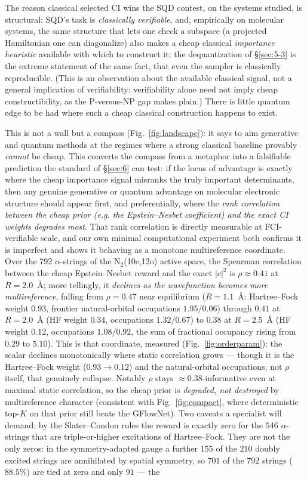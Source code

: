 \documentclass[onecolumn,a4paper]{quantumarticle}
\begin{document}
The reason classical selected CI wins the SQD contest, on the systems studied, is structural: SQD's task is \emph{classically verifiable}, and, empirically on molecular systems, the same structure that lets one check a subspace (a projected Hamiltonian one can diagonalize) also makes a cheap classical \emph{importance heuristic} available with which to construct it; the dequantization of \S\ref{sec:5-3} is the extreme statement of the same fact, that even the sampler is classically reproducible. (This is an observation about the available classical signal, not a general implication of verifiability: verifiability alone need not imply cheap constructibility, as the P-versus-NP gap makes plain.) There is little quantum edge to be had where such a cheap classical construction happens to exist.

This is not a wall but a compass (Fig.~\ref{fig:landscape}): it says to aim generative and quantum methods at the regimes where a strong classical baseline provably \emph{cannot} be cheap. This converts the compass from a metaphor into a falsifiable prediction the standard of \S\ref{sec:6} can test: if the locus of advantage is exactly where the cheap importance signal misranks the truly important determinants, then any genuine generative or quantum advantage on molecular electronic structure should appear first, and preferentially, where the \emph{rank correlation between the cheap prior (e.g. the Epstein--Nesbet coefficient) and the exact CI weights degrades most}. That rank correlation is directly measurable at FCI-verifiable scale, and our own minimal computational experiment both confirms it is imperfect and shows it behaving as a monotone multireference coordinate. Over the 792 $\alpha$-strings of the N$_2$(10e,12o) active space, the Spearman correlation between the cheap Epstein--Nesbet reward and the exact $|c|^2$ is $\rho{\approx}0.41$ at $R=2.0$~\AA{}; more tellingly, it \emph{declines as the wavefunction becomes more multireference}, falling from $\rho{=}0.47$ near equilibrium ($R=1.1$~\AA{}: Hartree--Fock weight $0.93$, frontier natural-orbital occupations $1.95/0.06$) through $0.41$ at $R=2.0$~\AA{} (HF weight $0.34$, occupations $1.32/0.67$) to $0.38$ at $R=2.5$~\AA{} (HF weight $0.12$, occupations $1.08/0.92$, the sum of fractional occupancy rising from $0.29$ to $5.10$). This is that coordinate, measured (Fig.~\ref{fig:orderparam}): the scalar declines monotonically where static correlation grows --- though it is the Hartree--Fock weight ($0.93\to0.12$) and the natural-orbital occupations, not $\rho$ itself, that genuinely collapse. Notably $\rho$ stays ${\approx}0.38$-informative even at maximal static correlation, so the cheap prior is \emph{degraded, not destroyed} by multireference character (consistent with Fig.~\ref{fig:compact}, where deterministic top-$K$ on that prior still beats the GFlowNet). Two caveats a specialist will demand: by the Slater--Condon rules the reward is exactly zero for the $546$ $\alpha$-strings that are triple-or-higher excitations of Hartree--Fock. They are not the only zeros: in the symmetry-adapted gauge a further $155$ of the $210$ doubly excited strings are annihilated by spatial symmetry, so $701$ of the $792$ strings ($88.5\%$) are tied at zero and only $91$ --- the 
\end{document}
